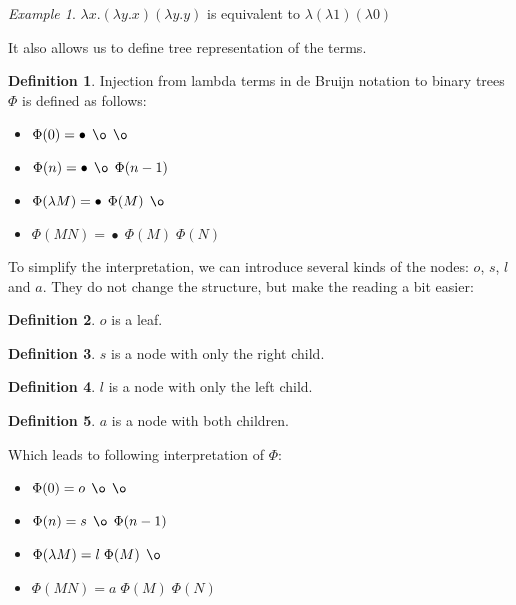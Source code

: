 \documentclass[final]{article}
\theoremstyle{definition}
\newtheorem{definition}{Definition}[subsection]
\theoremstyle{definition}
\theoremstyle{remark}
\newtheorem{example}{Example}[subsection]
\DeclareMathOperator{\n}{\bullet}
\DeclareMathOperator{\no}{\o}
\begin{document}
\begin{example}
    \(\lambda x . (\lambda y . x) (\lambda y . y)\) is equivalent to \(\lambda (\lambda 1) (\lambda 0)\)
\end{example}

It also allows us to define tree representation of the terms.

\begin{definition}
    Injection from lambda terms in de Bruijn notation to binary trees \(\Phi\) is defined as follows:
    \begin{itemize}
        \item \(\Phi(0) = \n\; \no\; \no\)
        \item \(\Phi(n) = \n\; \no\; \Phi(n - 1)\)
        \item \(\Phi(\lambda M) = \n\; \Phi(M)\; \no\)
        \item \(\Phi(M N) = \n\; \Phi(M)\; \Phi(N)\)
    \end{itemize}
\end{definition}

To simplify the interpretation, we can introduce several kinds of the nodes: \(o\), \(s\), \(l\) and \(a\). They do not change the structure, but make the reading a bit easier:

\begin{definition}
    \(o\) is a leaf.
\end{definition}

\begin{definition}
    \(s\) is a node with only the right child.
\end{definition}

\begin{definition}
    \(l\) is a node with only the left child.
\end{definition}

\begin{definition}
    \(a\) is a node with both children.
\end{definition}

Which leads to following interpretation of \(\Phi\):

\begin{itemize}
    \item \(\Phi(0) = o\; \no\; \no\)
    \item \(\Phi(n) = s\; \no\; \Phi(n - 1)\)
    \item \(\Phi(\lambda M) = l\; \Phi(M)\; \no\)
    \item \(\Phi(M N) = a\; \Phi(M)\; \Phi(N)\)
\end{itemize}
\end{document}
